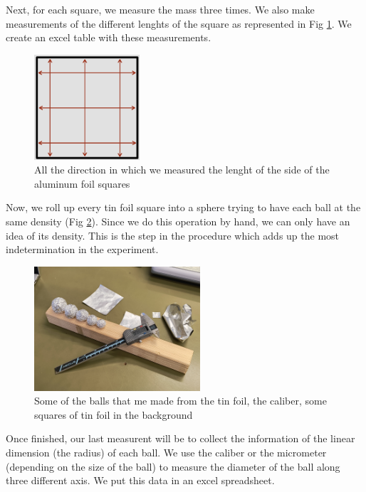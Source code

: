 \documentclass[a4paper,12pt]{article}
\begin{document}
Next, for each square, we measure the mass three times. We also make measurements of the different 
lenghts of the square as represented in Fig \ref{fig:sq_measure}. We create an excel table with 
these measurements.

\begin{figure}[h]
    \centering
    \includegraphics[width = 0.35\textwidth]{square_measure.png}
    \caption{All the direction in which we measured the lenght of the side of the aluminum foil squares}
    \label{fig:sq_measure}
\end{figure}

Now, we roll up every tin foil square into a sphere trying to have each ball at the same density (Fig \ref{fig:tf_balls}). 
Since we do this operation by hand, we can only have an idea of its density. This is the step in the 
procedure which adds up the most indetermination in the experiment.

\begin{figure}[h]
    \centering
    \includegraphics[width = 0.55\textwidth]{Tin_foil_balls.jpg}
    \caption{Some of the balls that me made from the tin foil, the caliber, some squares of tin foil in the background}
    \label{fig:tf_balls}
\end{figure}

Once finished, our last measurent will be to collect the information of the linear dimension (the radius) 
of each ball. We use the caliber or the micrometer (depending on the size of the ball) to measure the diameter 
of the ball along three different axis. We put this data in an excel spreadsheet.
\end{document}
